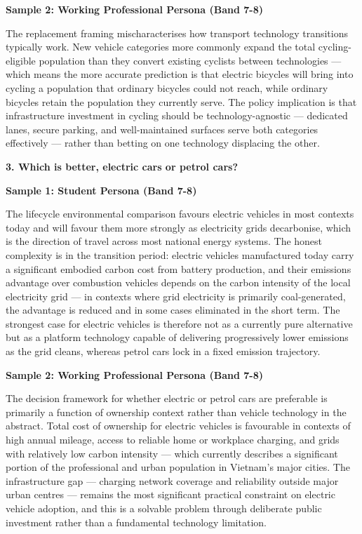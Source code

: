 \textbf{Sample 2: Working Professional Persona (Band 7-8)}

The replacement framing mischaracterises how transport technology transitions typically work. New vehicle categories more commonly expand the total cycling-eligible population than they convert existing cyclists between technologies — which means the more accurate prediction is that electric bicycles will bring into cycling a population that ordinary bicycles could not reach, while ordinary bicycles retain the population they currently serve. The policy implication is that infrastructure investment in cycling should be technology-agnostic — dedicated lanes, secure parking, and well-maintained surfaces serve both categories effectively — rather than betting on one technology displacing the other.

\separator

\begin{ieltsquestion}
\textbf{3. Which is better, electric cars or petrol cars?}
\end{ieltsquestion}
\textbf{Sample 1: Student Persona (Band 7-8)}

The lifecycle environmental comparison favours electric vehicles in most contexts today and will favour them more strongly as electricity grids decarbonise, which is the direction of travel across most national energy systems. The honest complexity is in the transition period: electric vehicles manufactured today carry a significant embodied carbon cost from battery production, and their emissions advantage over combustion vehicles depends on the carbon intensity of the local electricity grid — in contexts where grid electricity is primarily coal-generated, the advantage is reduced and in some cases eliminated in the short term. The strongest case for electric vehicles is therefore not as a currently pure alternative but as a platform technology capable of delivering progressively lower emissions as the grid cleans, whereas petrol cars lock in a fixed emission trajectory.

\textbf{Sample 2: Working Professional Persona (Band 7-8)}

The decision framework for whether electric or petrol cars are preferable is primarily a function of ownership context rather than vehicle technology in the abstract. Total cost of ownership for electric vehicles is favourable in contexts of high annual mileage, access to reliable home or workplace charging, and grids with relatively low carbon intensity — which currently describes a significant portion of the professional and urban population in Vietnam's major cities. The infrastructure gap — charging network coverage and reliability outside major urban centres — remains the most significant practical constraint on electric vehicle adoption, and this is a solvable problem through deliberate public investment rather than a fundamental technology limitation.


